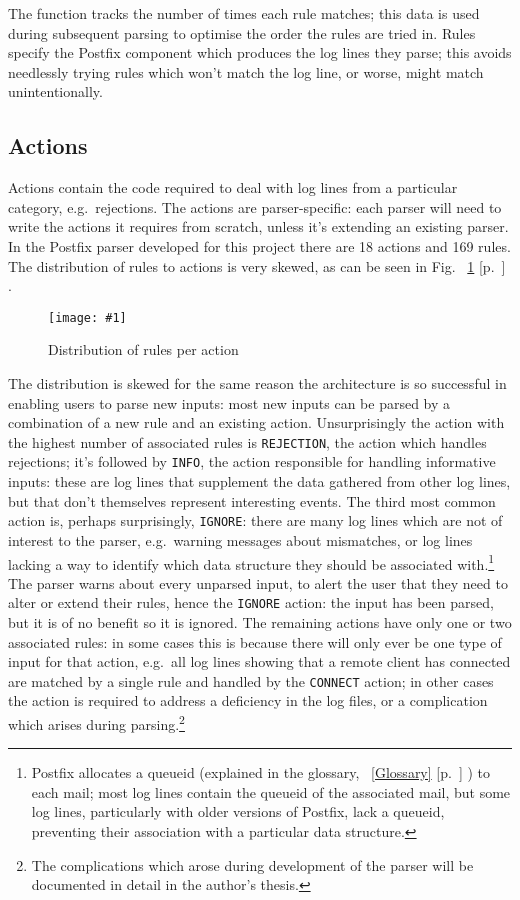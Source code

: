 \documentclass[draft]{svmult}
\newcommand{\showgraph}[3]{
    \begin{figure}[hbt!]
        \caption{#2}\label{#3}
        \texttt{[image: \#1]}
    \end{figure}
}
\newcommand{\refwithpage}[1]{%
    \empty{}\ref{#1} [p.~\pageref{#1}]%
}
\newcommand{\sectionref}[1]{%
    \textsection{}\refwithpage{#1}%
}
\newcommand{\numberOFrules}[0]{%
    169%
}
\newcommand{\numberOFactions}[0]{%
    18%
}
\begin{document}
The function tracks the number of times each rule matches; this data is
used during subsequent parsing to optimise the order the rules are tried
in.  Rules specify the Postfix component which produces the log lines they
parse; this avoids needlessly trying rules which won't match the log line,
or worse, might match unintentionally.

\subsection{Actions}

\label{Actions}

Actions contain the code required to deal with log lines from a particular
category, e.g.\ rejections.  The actions are parser-specific: each parser
will need to write the actions it requires from scratch, unless it's
extending an existing parser.  In the Postfix parser developed for this
project there are \numberOFactions{} actions and \numberOFrules{} rules.
The distribution of rules to actions is very skewed, as can be seen in
Fig.~\refwithpage{Distribution of rules per action}.
\showgraph{build/plot-action-distribution}{Distribution of rules per
action}{Distribution of rules per action} The distribution is skewed for
the same reason the architecture is so successful in enabling users to
parse new inputs: most new inputs can be parsed by a combination of a new
rule and an existing action.  Unsurprisingly the action with the highest
number of associated rules is \texttt{REJECTION}, the action which handles
rejections; it's followed by \texttt{INFO}, the action responsible for
handling informative inputs: these are log lines that supplement the data
gathered from other log lines, but that don't themselves represent
interesting events.  The third most common action is, perhaps surprisingly,
\texttt{IGNORE}: there are many log lines which are not of interest to the
parser, e.g.\ warning messages about \DNS{} mismatches, or log lines
lacking a way to identify which data structure they should be associated
with.\footnote{Postfix allocates a queueid (explained in the
glossary,~\sectionref{Glossary}) to each mail; most log lines contain the
queueid of the associated mail, but some log lines, particularly with older
versions of Postfix, lack a queueid, preventing their association with a
particular data structure.}  The parser warns about every unparsed input,
to alert the user that they need to alter or extend their rules, hence the
\texttt{IGNORE} action: the input has been parsed, but it is of no benefit
so it is ignored.  The remaining actions have only one or two associated
rules: in some cases this is because there will only ever be one type of
input for that action, e.g.\ all log lines showing that a remote client has
connected are matched by a single rule and handled by the \texttt{CONNECT}
action; in other cases the action is required to address a deficiency in
the log files, or a complication which arises during
parsing.\footnote{\label{complications footnote}The complications which
arose during development of the parser will be documented in detail in the
author's thesis.}
\end{document}
